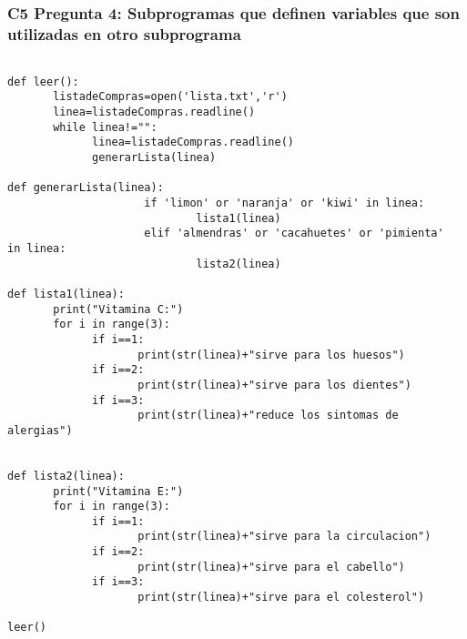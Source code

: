 \subsubsection{C5 Pregunta 4: Subprogramas que definen variables que son utilizadas en otro subprograma}

\begin{verbatim}

def leer():
       listadeCompras=open('lista.txt','r')
       linea=listadeCompras.readline()
       while linea!="":
             linea=listadeCompras.readline()
             generarLista(linea)
             
def generarLista(linea):
                     if 'limon' or 'naranja' or 'kiwi' in linea:
                             lista1(linea)
                     elif 'almendras' or 'cacahuetes' or 'pimienta'  in linea:
                             lista2(linea)
                                      
def lista1(linea):
       print("Vitamina C:")
       for i in range(3):
             if i==1:
                    print(str(linea)+"sirve para los huesos")
             if i==2:
                    print(str(linea)+"sirve para los dientes")
             if i==3:
                    print(str(linea)+"reduce los sintomas de alergias")
               

def lista2(linea):
       print("Vitamina E:")
       for i in range(3):
             if i==1:
                    print(str(linea)+"sirve para la circulacion")
             if i==2:
                    print(str(linea)+"sirve para el cabello")
             if i==3:
                    print(str(linea)+"sirve para el colesterol")
                        
leer()

\end{verbatim}
